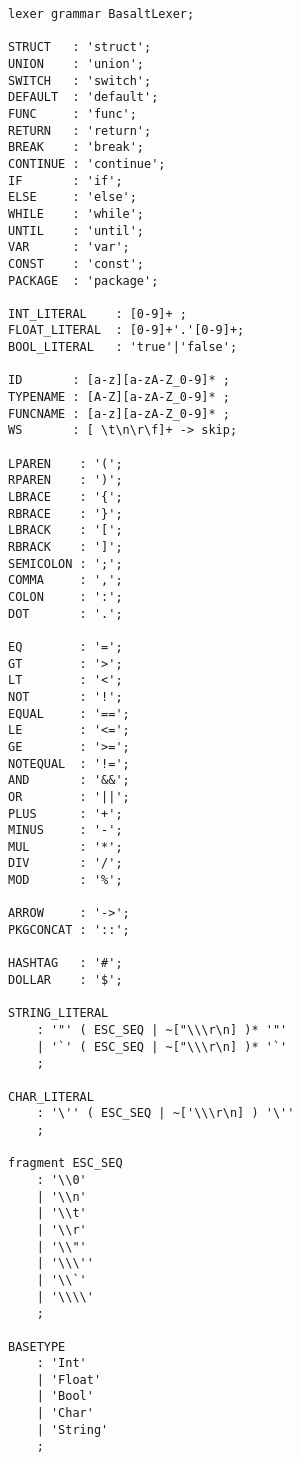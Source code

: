 \vspace{0.5cm}
\begin{lstlisting}[frame=single]
lexer grammar BasaltLexer;

STRUCT   : 'struct';
UNION    : 'union';
SWITCH   : 'switch';
DEFAULT  : 'default';
FUNC     : 'func';
RETURN   : 'return';
BREAK    : 'break';
CONTINUE : 'continue';
IF       : 'if';
ELSE     : 'else';
WHILE    : 'while';
UNTIL    : 'until';
VAR      : 'var';
CONST    : 'const';
PACKAGE  : 'package';

INT_LITERAL    : [0-9]+ ;
FLOAT_LITERAL  : [0-9]+'.'[0-9]+;
BOOL_LITERAL   : 'true'|'false';

ID       : [a-z][a-zA-Z_0-9]* ;
TYPENAME : [A-Z][a-zA-Z_0-9]* ;
FUNCNAME : [a-z][a-zA-Z_0-9]* ;
WS       : [ \t\n\r\f]+ -> skip;

LPAREN    : '(';
RPAREN    : ')';
LBRACE    : '{';
RBRACE    : '}';
LBRACK    : '[';
RBRACK    : ']';
SEMICOLON : ';';
COMMA     : ',';
COLON     : ':';
DOT       : '.';

EQ        : '=';
GT        : '>';
LT        : '<';
NOT       : '!';
EQUAL     : '==';
LE        : '<=';
GE        : '>=';
NOTEQUAL  : '!=';
AND       : '&&';
OR        : '||';
PLUS      : '+';
MINUS     : '-';
MUL       : '*';
DIV       : '/';
MOD       : '%';

ARROW     : '->';
PKGCONCAT : '::';

HASHTAG   : '#';
DOLLAR    : '$';

STRING_LITERAL
    : '"' ( ESC_SEQ | ~["\\\r\n] )* '"'
    | '`' ( ESC_SEQ | ~["\\\r\n] )* '`'
    ;

CHAR_LITERAL
    : '\'' ( ESC_SEQ | ~['\\\r\n] ) '\''
    ;

fragment ESC_SEQ
    : '\\0'
    | '\\n' 
    | '\\t'
    | '\\r'
    | '\\"'
    | '\\\''
    | '\\`'
    | '\\\\'
    ;

BASETYPE 
    : 'Int' 
    | 'Float' 
    | 'Bool' 
    | 'Char' 
    | 'String'
    ;

\end{lstlisting}
\vspace{0.5cm}